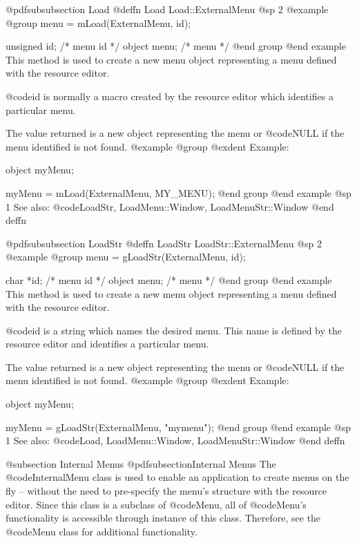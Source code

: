 @pdfsubsubsection {Load}
@deffn {Load} Load::ExternalMenu
@sp 2
@example
@group
menu = mLoad(ExternalMenu, id);

unsigned  id;   /*  menu id  */
object  menu;   /*  menu     */
@end group
@end example
This method is used to create a new menu object representing a menu defined
with the resource editor.

@code{id} is normally a macro created by the resource editor which identifies
a particular menu.

The value returned is a new object representing the menu or @code{NULL} if
the menu identified is not found.
@example
@group
@exdent Example:

object  myMenu;

myMenu = mLoad(ExternalMenu, MY_MENU);
@end group
@end example
@sp 1
See also:  @code{LoadStr, LoadMenu::Window, LoadMenuStr::Window}
@end deffn







@pdfsubsubsection {LoadStr}
@deffn {LoadStr} LoadStr::ExternalMenu
@sp 2
@example
@group
menu = gLoadStr(ExternalMenu, id);

char    *id;    /*  menu id  */
object  menu;   /*  menu     */
@end group
@end example
This method is used to create a new menu object representing a menu defined
with the resource editor.

@code{id} is a string which names the desired menu.  This name is
defined by the resource editor and identifies a particular menu.

The value returned is a new object representing the menu or @code{NULL} if
the menu identified is not found.
@example
@group
@exdent Example:

object  myMenu;

myMenu = gLoadStr(ExternalMenu, "mymenu");
@end group
@end example
@sp 1
See also:  @code{Load, LoadMenu::Window, LoadMenuStr::Window}
@end deffn








@subsection Internal Menus
@pdfsubsection{Internal Menus}
The @code{InternalMenu} class is used to enable an application to create
menus on the fly -- without the need to pre-specify the menu's structure
with the resource editor.  Since this class is a subclass of
@code{Menu}, all of @code{Menu}'s functionality is accessible through
instance of this class.  Therefore, see the @code{Menu} class for
additional functionality.








